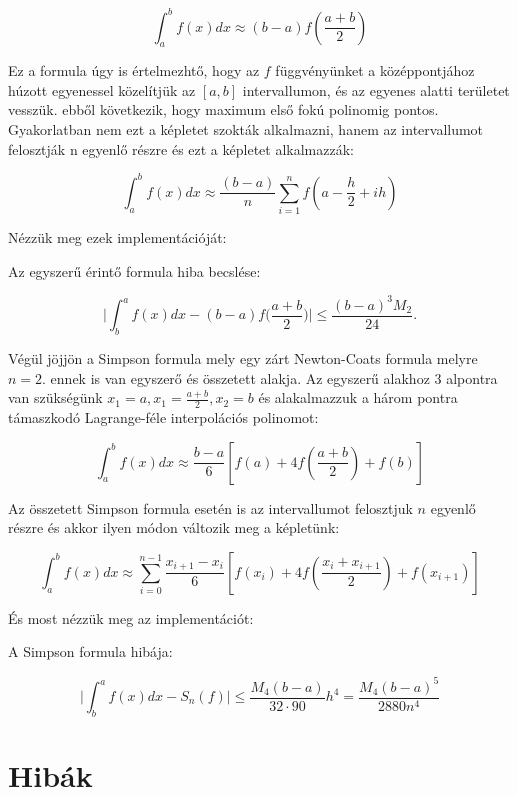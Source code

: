 \[
\int^b_a f(x)dx \approx (b-a)f( \frac{a+b}{2})
\]

Ez a formula úgy is értelmezhtő, hogy az \(f\) függvényünket a
középpontjához húzott egyenessel közelítjük az \([a,b]\) intervallumon,
és az egyenes alatti területet vesszük. ebből következik, hogy maximum
első fokú polinomig pontos. Gyakorlatban nem ezt a képletet szokták
alkalmazni, hanem az intervallumot felosztják n egyenlő részre és ezt a
képletet alkalmazzák:

\[
\int^b_a f(x)dx \approx \frac{(b-a)}{n}\sum^{n}_{i=1}f( a-\frac{h}{2}+ih)
\]

Nézzük meg ezek implementációját:

\begin{python}

\end{python}

    Az egyszerű érintő formula hiba becslése:

\[
\big| \int^a_b f(x)dx-(b-a) f \big( \frac{a+b}{2} \big)\big| \leq \frac {(b-a)^3M_2}{24}.
\]

    Végül jöjjön a Simpson formula mely egy zárt Newton-Coats formula melyre
\(n=2\). ennek is van egyszerő és összetett alakja. Az egyszerű alakhoz
3 alpontra van szükségünk \(x_1=a, x_1=\frac {a+b}{2}, x_2=b\) és
alakalmazzuk a három pontra támaszkodó Lagrange-féle interpolációs
polinomot:

\[
\int^b_a f(x)dx \approx \frac{b-a}{6} [f(a)+4f(\frac{a+b}{2})+f(b)]
\]

Az összetett Simpson formula esetén is az intervallumot felosztjuk \(n\)
egyenlő részre és akkor ilyen módon változik meg a képletünk:

\[
\int^b_a f(x)dx \approx \sum^{n-1}_{i=0}\frac{x_{i+1}-x_i}{6} [ f(x_i) + 4f( \frac{x_i+x_{i+1}}{2})+ f({x_{i+1}} ) ]
\]

És most nézzük meg az implementációt:

\begin{python}

\end{python}


    A Simpson formula hibája:

\[
\big|\int^a_b f(x)dx- S_n(f)\big| \leq \frac {M_4(b-a)}{32 \cdot 90}h^4 = \frac {M_4(b-a)^5}{2880n^4}
\]

\section{Hibák}\label{hibuxe1k}

